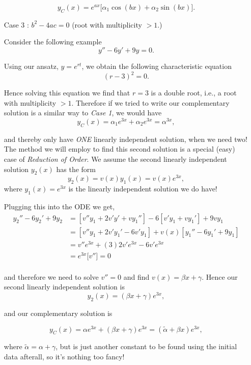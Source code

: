 \begin{itemize}
$$y_C(x) = e^{ax} \Big[ \alpha_1 \cos(bx) + \alpha_2 \sin(bx) \Big].$$


%
%
\item[Case 3]: $b^2-4ac = 0$ (root with multiplicity $> 1$.)

Consider the following example $$y'' - 6y' + 9y = 0.$$

Using our ansatz, $y=e^{rt}$, we obtain the following characteristic equation $$(r-3)^2 = 0.$$

Hence solving this equation we find that $r=3$ is a double root, i.e., a root with multiplicity $> 1$. Therefore if we tried to write our complementary solution is a similar way to \emph{Case 1}, we would have $$y_C(x) = \alpha_1 e^{3x} + \alpha_2 e^{3x} = \alpha ^{3x},$$

and thereby only have \emph{ONE} linearly independent solution, when we need two! The method we will employ to find this second solution is a special (easy) case of \emph{Reduction of Order}. We assume the second linearly independent solution $y_2(x)$ has the form $$y_2(x) = v(x)y_1(x) = v(x) e^{3x},$$ where $y_1(x) = e^{3x}$ is the linearly independent solution we do have!

Plugging this into the ODE we get,
\begin{align*}
y_2'' - 6y_2' + 9y_2 &= [v'' y_1 + 2v'y' + vy_1''] - 6[v'y_1 + vy_1'] + 9vy_1 \\
&= [v''y_1 +2v'y_1' - 6v'y_1] + v(x) [ y_1'' - 6y_1' + 9y_1] \\
&= v''e^{3x} + (3)2v'e^{3x} - 6v'e^{3x} \\
&= e^{3x} \Big[ v'' \Big] = 0 \\
\end{align*}

and therefore we need to solve $v'' = 0$ and find $v(x) = \beta x + \gamma.$ Hence our second linearly independent solution is $$y_2(x) = ( \beta x+\gamma)e^{3x},$$

and our complementary solution is

$$y_C(x) = \alpha e^{3x} + ( \beta x+\gamma)e^{3x} = ( \tilde{\alpha} + \beta x )e^{3x},$$

where $\tilde{\alpha} = \alpha+\gamma$, but is just another constant to be found using the initial data afterall, so it's nothing too fancy!

\end{itemize}



%
%

